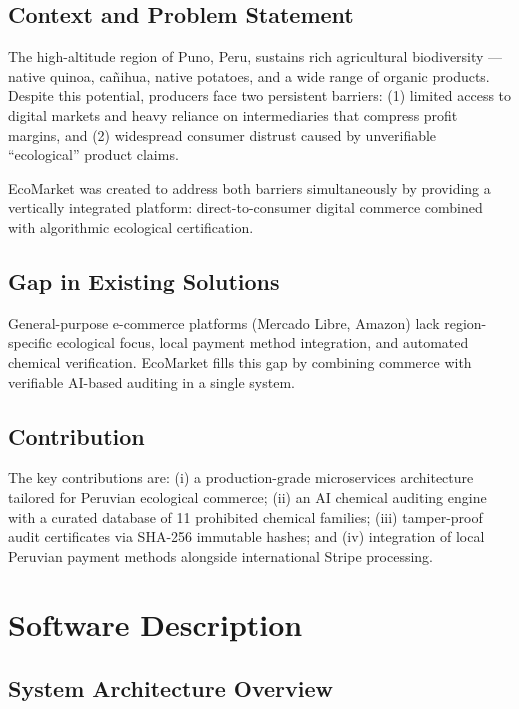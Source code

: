 \documentclass[10pt,a4paper,twocolumn]{article}
\begin{document}
\subsection{Context and Problem Statement}

The high-altitude region of Puno, Peru, sustains rich agricultural
biodiversity — native quinoa, cañihua, native potatoes, and a wide
range of organic products. Despite this potential, producers face two
persistent barriers: (1) limited access to digital markets and heavy
reliance on intermediaries that compress profit margins, and (2) widespread
consumer distrust caused by unverifiable ``ecological'' product claims.

EcoMarket was created to address both barriers simultaneously by providing
a vertically integrated platform: direct-to-consumer digital commerce
combined with algorithmic ecological certification.

\subsection{Gap in Existing Solutions}

General-purpose e-commerce platforms (Mercado Libre, Amazon) lack
region-specific ecological focus, local payment method integration,
and automated chemical verification. EcoMarket fills this gap by
combining commerce with verifiable AI-based auditing in a single system.

\subsection{Contribution}

The key contributions are: (i) a production-grade microservices
architecture tailored for Peruvian ecological commerce; (ii) an
AI chemical auditing engine with a curated database of 11 prohibited
chemical families; (iii) tamper-proof audit certificates via SHA-256
immutable hashes; and (iv) integration of local Peruvian payment methods
alongside international Stripe processing.

\section{Software Description}

\subsection{System Architecture Overview}
\end{document}
